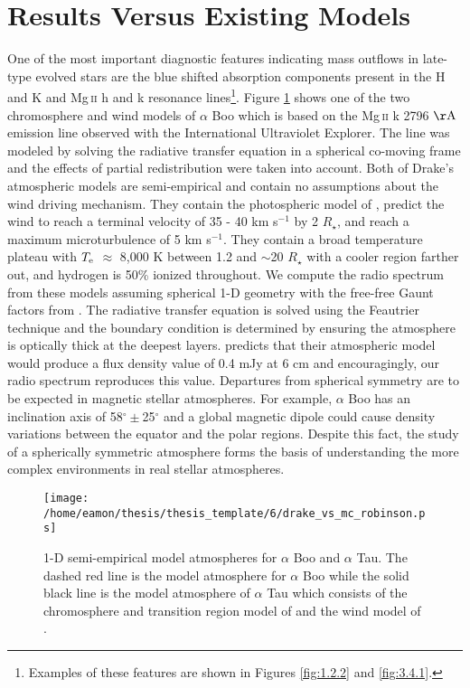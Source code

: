 \section{Results Versus Existing Models}\label{sec:6.5}
One of the most important diagnostic features indicating mass outflows in late-type evolved stars are the blue shifted absorption components present in the  H and K and Mg\,\textsc{ii} h and k resonance lines\footnote{Examples of these features are shown in Figures \ref{fig:1.2.2} and \ref{fig:3.4.1}.}. Figure \ref{fig6.5.1} shows one of the two chromosphere and wind models of $\alpha$ Boo \cite[`model A']{drake_1985} which is based on the Mg\,\textsc{ii} k 2796 $\rm{\AA}$ emission line observed with the International Ultraviolet Explorer. The line was modeled by solving the radiative transfer equation in a spherical co-moving frame and the effects of partial redistribution \citep[e.g.,][]{drake_1983b} were taken into account. Both of Drake’s atmospheric models
are semi-empirical and contain no assumptions about the wind driving mechanism. They contain the photospheric model of \cite{ayres_1975}, predict the wind to reach a terminal velocity of 35 - 40 km s${}^{-1}$ by 2 $R _{\star}$, and reach a maximum microturbulence of 5 km s$^{-1}$. They contain a broad temperature plateau with $T_{\rm{e}}$ $\approx$ 8,000 K between 1.2 and $\sim$20 $R _{\star}$ with a cooler region farther out, and hydrogen is 50\% ionized throughout. We compute the radio spectrum from these models assuming spherical 1-D geometry \citep{harper_1994} with the free-free Gaunt factors from \cite{hummer_1988}. The radiative transfer equation is solved using the Feautrier technique \citep{mihalas_1978} and the boundary condition is determined by ensuring the atmosphere is optically thick at the deepest layers. \cite{drake_1985} predicts that their atmospheric model would produce a flux density value of 0.4 mJy at 6 cm and encouragingly, our radio spectrum reproduces this value. Departures from spherical symmetry are to be expected in magnetic stellar atmospheres. For example, $\alpha$ Boo has an inclination axis of 58$^{\circ} \pm$25$^{\circ}$ \citep{gray_2006} and a global magnetic dipole could cause density variations between the equator and the polar regions. Despite this fact, the study of a  spherically symmetric atmosphere forms the basis of understanding the more complex environments in real stellar atmospheres.

\begin{figure}[t!]
\centering 
          \texttt{[image: /home/eamon/thesis/thesis\_template/6/drake\_vs\_mc\_robinson.ps]}
\caption[1-D semi-empirical model atmospheres for $\alpha$ Boo and $\alpha$ Tau]{1-D semi-empirical model atmospheres for $\alpha$ Boo and $\alpha$ Tau. The dashed red line is the model atmosphere for $\alpha$ Boo \citep{drake_1985} while the solid black line is the model atmosphere of $\alpha$ Tau which consists of the chromosphere and transition region model of \cite{mcmurry_1999} and the wind model of \cite{robinson_1998}.}
\label{fig6.5.1}
\end{figure}

